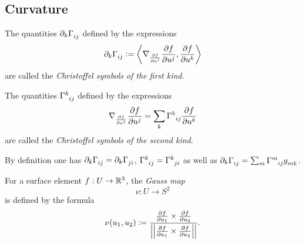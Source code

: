 \documentclass[../main.tex]{subfiles}
\begin{document}
\subsection{Curvature}
\begin{definition}\label{Manifold:ChristoffelSymbol}

    \begin{APAenumerate}
        \item The quantities $\partial_k\tensor{\Gamma}{_i_j}$ defined by the expressions
        \begin{equation*}
            \partial_k\tensor{\Gamma}{_i_j}
            \defeq
            \inner{\nabla_{\frac{\partial f}{\partial\tensor{u}{^i}}}\frac{\partial f}{\partial\tensor{u}{^j}}}{\frac{\partial f}{\partial\tensor{u}{^k}}}
        \end{equation*}
        are called the \textit{Christoffel symbols of the first kind}.
        \item The quantities $\tensor{\Gamma}{^k_i_j}$ defined by the expressions
        \begin{equation*}
            \nabla_{\frac{\partial f}{\partial\tensor{u}{^i}}}\frac{\partial f}{\partial\tensor{u}{^j}}
            =
            \sum_k{\tensor{\Gamma}{^k_i_j}\frac{\partial f}{\partial\tensor{u}{^k}}}
        \end{equation*}
        are called the \textit{Christoffel symbols of the second kind}.
        \item By definition one has $\partial_k\tensor{\Gamma}{_i_j}=\partial_k\tensor{\Gamma}{_j_i}$, $\tensor{\Gamma}{^k_i_j}=\tensor{\Gamma}{^k_j_i}$
        as well as $\partial_k\tensor{\Gamma}{_i_j}=\sum_{m}\tensor{\Gamma}{^m_i_j}\tensor{g}{_m_k}$.
    \end{APAenumerate}
\end{definition}
\begin{definition}\label{Curvature:Gauss}
    For a surface element $f:U\to\mathbb{R}^{3}$, the \textit{Gauss map}
    \begin{equation*}
        \nu:U\to S^2
    \end{equation*}
    is defined by the formula
    \begin{equation*}
        \nu(u_1, u_2)
        \vcentcolon=
        \frac
        {\frac{\partial f}{\partial u_1}\times\frac{\partial f}{\partial u_2}}
        {\left|\left|{\frac{\partial f}{\partial u_1}\times\frac{\partial f}{\partial u_2}}\right|\right|}
        \text{.}
    \end{equation*}
\end{definition}
\end{document}
